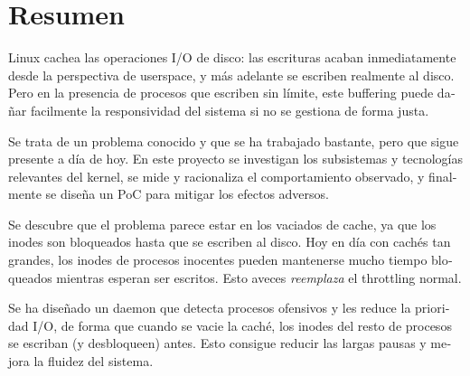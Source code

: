 \documentclass[a4paper,12pt]{article}
\begin{document}
\clearpage
{}
{}
\section*{Resumen}

\begin{otherlanguage}{spanish}
Linux cachea las operaciones I/O de disco: las escrituras acaban inmediatamente desde la perspectiva de userspace, y más adelante se escriben realmente al disco. Pero en la presencia de procesos que escriben sin límite, este buffering puede dañar facilmente la responsividad del sistema si no se gestiona de forma justa.

Se trata de un problema conocido y que se ha trabajado bastante, pero que sigue presente a día de hoy. En este proyecto se investigan los subsistemas y tecnologías relevantes del kernel, se mide y racionaliza el comportamiento observado, y finalmente se diseña un PoC para mitigar los efectos adversos.

Se descubre que el problema parece estar en los vaciados de cache, ya que los inodes son bloqueados hasta que se escriben al disco. Hoy en día con cachés tan grandes, los inodes de procesos inocentes pueden mantenerse mucho tiempo bloqueados mientras esperan ser escritos. Esto aveces \emph{reemplaza} el throttling normal.

Se ha diseñado un daemon que detecta procesos ofensivos y les reduce la prioridad I/O, de forma que cuando se vacie la caché, los inodes del resto de procesos se escriban (y desbloqueen) antes. Esto consigue reducir las largas pausas y mejora la fluidez del sistema.
\end{otherlanguage}


\clearpage


\newpage
{\hypersetup{linkcolor=black}
\tableofcontents
}

\newpage
{\hypersetup{linkcolor=black}
\listoffigures
\listoflistings
\listoftables
}


\clearpage


\clearpage


\clearpage



\clearpage


\clearpage


\clearpage

\medskip




\clearpage
\newpage
\begin{appendices}



\end{appendices}

\cleardoublepage
{}
{}
\printacronyms[include=abbrev,name=Glossary]
\end{document}
